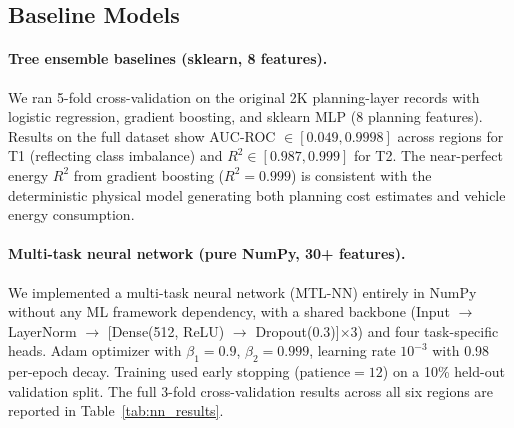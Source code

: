 \documentclass{article}
\begin{document}
\subsection{Baseline Models}

\paragraph{Tree ensemble baselines (sklearn, 8 features).}
We ran 5-fold cross-validation on the original 2K planning-layer records
with logistic regression, gradient boosting, and sklearn MLP (8 planning
features). Results on the full dataset \citep{baseline_experiments} show
AUC-ROC $\in [0.049, 0.9998]$ across regions for T1 (reflecting class
imbalance) and $R^2 \in [0.987, 0.999]$ for T2. The near-perfect energy
$R^2$ from gradient boosting ($R^2 = 0.999$) is consistent with the
deterministic physical model generating both planning cost estimates and
vehicle energy consumption.

\paragraph{Multi-task neural network (pure NumPy, 30+ features).}
We implemented a multi-task neural network (MTL-NN) entirely in NumPy
without any ML framework dependency, with a shared backbone
(Input $\to$ LayerNorm $\to$ [Dense(512, ReLU) $\to$ Dropout(0.3)]$\times$3)
and four task-specific heads. Adam optimizer with $\beta_1=0.9$,
$\beta_2=0.999$, learning rate $10^{-3}$ with 0.98 per-epoch decay.
Training used early stopping ($\text{patience}=12$) on a 10\% held-out
validation split. The full 3-fold cross-validation results across all six
regions are reported in Table~\ref{tab:nn_results}.
\end{document}
